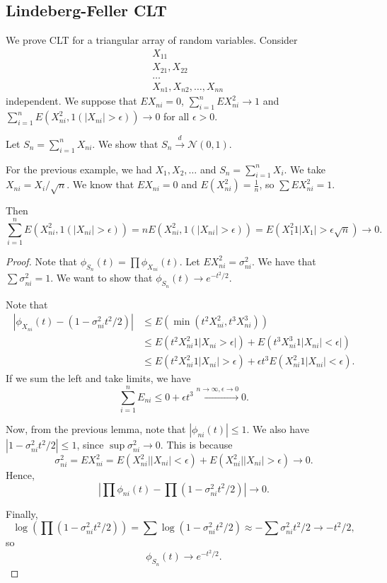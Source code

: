 \documentclass[11pt]{scrartcl}
\begin{document}
\subsection{Lindeberg-Feller CLT}
\begin{thm}
We prove CLT for a triangular array of random variables.  Consider
\begin{align*}
&X_{11} \\
&X_{21}, X_{22} \\
&\dots \\
&X_{n1}, X_{n2}, \dots, X_{nn}
\end{align*}
independent.
We suppose that $EX_{ni} = 0$, $\sum_{i=1}^n EX_{ni}^2 \to 1$ and $\sum_{i=1}^n E(X_{ni}^2, 1(|X_{ni}| > \epsilon)) \to 0$ for all $\epsilon > 0$.

Let $S_n = \sum_{i=1}^n X_{ni}$.  We show that $S_n \xrightarrow{d} \mathcal N(0, 1)$.
\end{thm}


\begin{example} For the previous example, we had $X_1, X_2, \dots$ and $S_n = \sum_{i=1}^n X_i$.  We take $X_{ni} = X_i/\sqrt{n}$.  We know that $EX_{ni} = 0$ and $E(X_{ni}^2) = \frac{1}{n}$, so $\sum EX_{ni}^2 = 1$.

Then $$\sum_{i=1}^n E(X_{ni}^2, 1(|X_{ni}| > \epsilon))  = nE(X_{ni}^2, 1(|X_{ni}| > \epsilon)) = E(X_1^2 1|X_1| > \epsilon\sqrt{n}) \to 0.$$
\end{example}
\begin{proof}
Note that $\phi_{S_n}(t) = \prod \phi_{X_{ni}}(t)$.  Let $EX_{ni}^2 = \sigma_{ni}^2$.   We have that $\sum \sigma_{ni}^2 = 1$.  We want to show that $\phi_{S_n}(t) \to e^{-t^2/2}.$

Note that
\begin{align*}
|\phi_{X_{ni}}(t) - (1 - \sigma_{ni}^2t^2/2)| &\le E(\min(t^2X_{ni}^2, t^3 X_{ni}^3)) \\
&\le E(t^2 X_{ni}^2 1|X_{ni} > \epsilon|) + E(t^3 X_{ni}^3 1|X_{ni}| < \epsilon|) \\
&\le E(t^2 X_{ni}^2 1|X_{ni}| > \epsilon) + \epsilon t^3 E(X_{ni}^2 1|X_{ni}| < \epsilon).
\end{align*}
If we sum the left and take limits, we have 
$$\sum_{i=1}^n E_{ni} \le 0 + \epsilon t^3 \xrightarrow{n \to \infty, \epsilon \to 0} 0.$$

Now, from the previous lemma, note that $|\phi_{ni}(t)| \le 1$.  We also have $|1 - \sigma_{ni}^2t^2/2| \le 1$, since $\sup \sigma_{ni}^2 \to 0$.  This is because $$\sigma_{ni}^2 = EX_{ni}^2 = E(X_{ni}^2 | |X_{ni}| < \epsilon) + E(X_{ni}^2| |X_{ni}| > \epsilon) \to 0.$$ Hence,
$$\left |\prod \phi_{ni}(t) - \prod(1 - \sigma_{ni}^2t^2/2)\right | \to 0.$$

Finally, $$\log \left (\prod(1 - \sigma_{ni}^2t^2/2)\right ) = \sum \log(1 - \sigma_{ni}^2t^2/2) \approx -\sum \sigma_{ni}^2t^2/2 \to -t^2/2,$$
so $$\phi_{S_n}(t) \to e^{-t^2/2}.$$
\end{proof}
\end{document}

